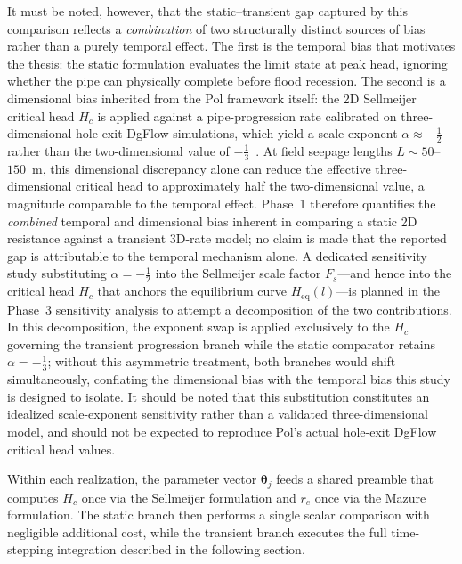 It must be noted, however, that the static--transient gap captured by this comparison reflects a \emph{combination} of two structurally distinct sources of bias rather than a purely temporal effect. The first is the temporal bias that motivates the thesis: the static formulation evaluates the limit state at peak head, ignoring whether the pipe can physically complete before flood recession. The second is a dimensional bias inherited from the Pol framework itself: the 2D Sellmeijer critical head $H_c$ is applied against a pipe-progression rate calibrated on three-dimensional hole-exit DgFlow simulations, which yield a scale exponent $\alpha \approx -\tfrac{1}{2}$ rather than the two-dimensional value of $-\tfrac{1}{3}$~\parencite{pol_compgeo_2024}. At field seepage lengths $L \sim 50$--$150$~m, this dimensional discrepancy alone can reduce the effective three-dimensional critical head to approximately half the two-dimensional value, a magnitude comparable to the temporal effect. Phase~1 therefore quantifies the \emph{combined} temporal and dimensional bias inherent in comparing a static 2D resistance against a transient 3D-rate model; no claim is made that the reported gap is attributable to the temporal mechanism alone. A dedicated sensitivity study substituting $\alpha = -\tfrac{1}{2}$ into the Sellmeijer scale factor $F_s$---and hence into the critical head $H_c$ that anchors the equilibrium curve $H_\mathrm{eq}(l)$---is planned in the Phase~3 sensitivity analysis to attempt a decomposition of the two contributions. In this decomposition, the exponent swap is applied exclusively to the $H_c$ governing the transient progression branch while the static comparator retains $\alpha = -\tfrac{1}{3}$; without this asymmetric treatment, both branches would shift simultaneously, conflating the dimensional bias with the temporal bias this study is designed to isolate. It should be noted that this substitution constitutes an idealized scale-exponent sensitivity rather than a validated three-dimensional model, and should not be expected to reproduce Pol's actual hole-exit DgFlow critical head values.

Within each realization, the parameter vector $\boldsymbol{\theta}_j$ feeds a shared preamble that computes $H_c$ once via the Sellmeijer formulation and $r_e$ once via the Mazure formulation. The static branch then performs a single scalar comparison with negligible additional cost, while the transient branch executes the full time-stepping integration described in the following section.

